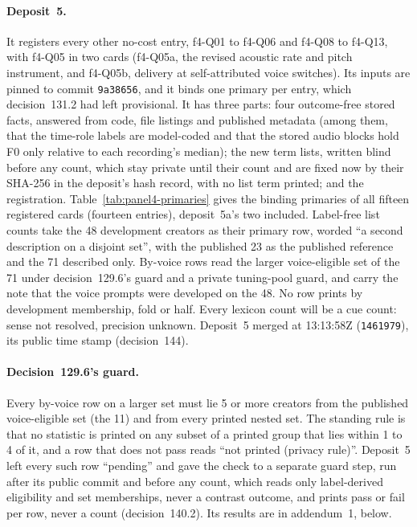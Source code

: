 \paragraph{Deposit~5.} It registers every other no-cost entry, f4-Q01 to f4-Q06 and f4-Q08 to f4-Q13, with f4-Q05 in two
cards (f4-Q05a, the revised acoustic rate and pitch instrument, and f4-Q05b, delivery at self-attributed voice switches).
Its inputs are pinned to commit \texttt{9a38656}, and it binds one primary per entry, which decision~131.2 had left
provisional. It has three parts: four outcome-free stored facts, answered from code, file listings and published metadata
(among them, that the time-role labels are model-coded and that the stored audio blocks hold F0 only relative to each
recording's median); the new term lists, written blind before any count, which stay private until their count and are
fixed now by their SHA-256 in the deposit's hash record, with no list term printed; and the registration.
Table~\ref{tab:panel4-primaries} gives the binding primaries of all fifteen registered cards (fourteen entries),
deposit~5a's two included. Label-free list counts take the 48 development creators as their primary row, worded ``a second description
on a disjoint set'', with the published 23 as the published reference and the 71 described only. By-voice rows read the
larger voice-eligible set of the 71 under decision~129.6's guard and a private tuning-pool guard, and carry the note that
the voice prompts were developed on the 48. No row prints by development membership, fold or half. Every lexicon count
will be a cue count: sense not resolved, precision unknown. Deposit~5 merged at 13:13:58Z (\texttt{1461979}), its public
time stamp (decision~144).

\paragraph{Decision~129.6's guard.} Every by-voice row on a larger set must lie 5 or more creators from the published
voice-eligible set (the 11) and from every printed nested set. The standing rule is that no statistic is printed on any
subset of a printed group that lies within 1 to 4 of it, and a row that does not pass reads ``not printed (privacy
rule)''. Deposit~5 left every such row ``pending'' and gave the check to a separate guard step, run after its public
commit and before any count, which reads only label-derived eligibility and set memberships, never a contrast outcome,
and prints pass or fail per row, never a count (decision~140.2). Its results are in addendum~1, below.

